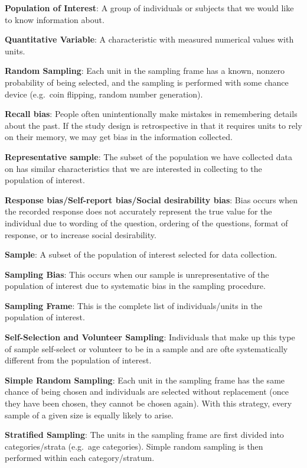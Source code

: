\documentclass[
]{book}
\begin{document}
\textbf{Population of Interest}: A group of individuals or subjects that we would like to know information about.

\textbf{Quantitative Variable}: A characteristic with measured numerical values with units.

\textbf{Random Sampling}: Each unit in the sampling frame has a known, nonzero probability of being selected, and the sampling is performed with some chance device (e.g.~coin flipping, random number generation).

\textbf{Recall bias}: People often unintentionally make mistakes in remembering details about the past. If the study design is retrospective in that it requires units to rely on their memory, we may get bias in the information collected.

\textbf{Representative sample}: The subset of the population we have collected data on has similar characteristics that we are interested in collecting to the population of interest.

\textbf{Response bias/Self-report bias/Social desirability bias}: Bias occurs when the recorded response does not accurately represent the true value for the individual due to wording of the question, ordering of the questions, format of response, or to increase social desirability.

\textbf{Sample}: A subset of the population of interest selected for data collection.

\textbf{Sampling Bias}: This occurs when our sample is unrepresentative of the population of interest due to systematic bias in the sampling procedure.

\textbf{Sampling Frame}: This is the complete list of individuals/units in the population of interest.

\textbf{Self-Selection and Volunteer Sampling}: Individuals that make up this type of sample self-select or volunteer to be in a sample and are ofte systematically different from the population of interest.

\textbf{Simple Random Sampling}: Each unit in the sampling frame has the same chance of being chosen and individuals are selected without replacement (once they have been chosen, they cannot be chosen again). With this strategy, every sample of a given size is equally likely to arise.

\textbf{Stratified Sampling}: The units in the sampling frame are first divided into categories/strata (e.g.~age categories). Simple random sampling is then performed within each category/stratum.
\end{document}
